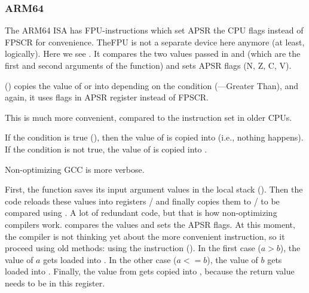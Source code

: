 \subsubsection{ARM64}




The ARM64 \ac{ISA} has FPU-instructions 
which set \ac{APSR} the CPU flags instead of \ac{FPSCR} for convenience.
The\ac{FPU} is not a separate device here anymore (at least, logically).
Here we see . It compares the two values passed in  and  (which are the first and second arguments of the function)
and sets \ac{APSR} flags (N, Z, C, V).

 () copies the value of  or  into  depending on the condition (---Greater Than),
and again, it uses flags in \ac{APSR} register instead of \ac{FPSCR}.

This is much more convenient, compared to the instruction set in older CPUs.

If the condition is true (), then the value of  
is copied into  (i.e., nothing happens).
If the condition is not true, the value of  
is copied into .




Non-optimizing GCC is more verbose.

First, the function saves its input argument values in the local stack ().
Then the code reloads these values into registers
/ and finally copies them to 
/ to be compared using . 
A lot of redundant code, 
but that is how non-optimizing compilers work.
 compares the values and sets the \ac{APSR} flags.
At this moment, 
the compiler is not thinking yet about the more convenient  instruction, so it proceed using old methods: 
using the  instruction ().
In the first case ($a>b$), the value of $a$ gets loaded 
into .
In the other case ($a<=b$), the value of $b$ gets loaded into 
.
Finally, the value from  gets copied into , 
because the return value needs to be in this 
register.


